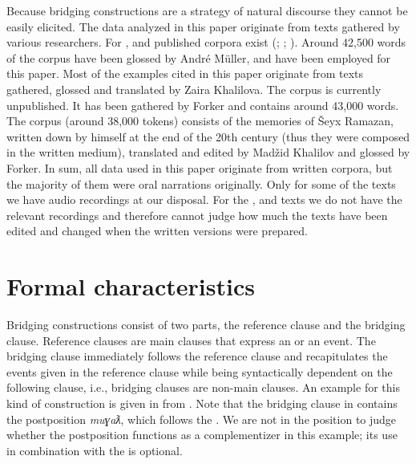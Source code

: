 \documentclass[output=paper]{LSP/langsci}
\begin{document}
Because bridging constructions are a strategy of natural discourse they cannot be easily elicited. The data analyzed in this paper originate from texts gathered by various researchers. For ,  and  published corpora exist (\citealt{vandenBerg.1995}; \citealt{Abdulaev.Abdullaev.2010}; \citealt{Karimova.2014}). Around 42,500 words of the  corpus have been glossed by André Müller, and have been employed for this paper. Most of the  examples cited in this paper originate from texts gathered, glossed and translated by Zaira Khalilova. The  corpus is currently unpublished. It has been gathered by Forker and contains around 43,000 words. The  corpus (around 38,000 tokens) consists of the memories of Šeyx Ramazan, written down by himself at the end of the 20th century (thus they were composed in the written medium), translated and edited by Madžid Khalilov and glossed by Forker. In sum, all data used in this paper originate from written corpora, but the majority of them were oral narrations originally. Only for some of the  texts we have audio recordings at our disposal. For the ,  and  texts we do not have the relevant recordings and therefore cannot judge how much the texts have been edited and changed when the written versions were prepared.

\section{Formal characteristics}
\label{sec:Formal characteristics} 
Bridging constructions consist of two parts, the reference clause and the bridging clause. Reference clauses are main clauses that express an  or an event. The bridging clause immediately follows the reference clause and recapitulates the events given in the reference clause while being syntactically dependent on the following clause, i.e., bridging clauses are non-main clauses. An example for this kind of construction is given in  from . Note that the bridging clause in  contains the postposition \textit{muɣaƛ}, which follows the . We are not in the position to judge whether the postposition functions as a complementizer in this example; its use in combination with the  is optional. 
\end{document}
